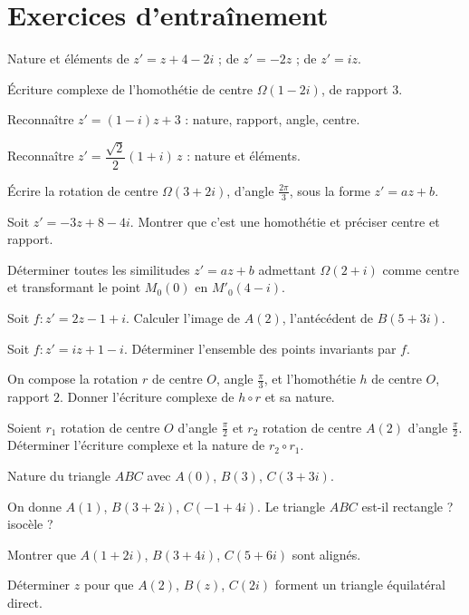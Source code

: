 \section{Exercices d'entraînement}

\exo{} Nature et éléments de $z'=z+4-2i$ ; de $z'=-2z$ ; de $z'=iz$.

\exo{} Écriture complexe de l'homothétie de centre $\Omega(1-2i)$, de rapport $3$.

\exo{} Reconnaître $z'=(1-i)z+3$ : nature, rapport, angle, centre.

\exo{} Reconnaître $z'=\dfrac{\sqrt2}{2}(1+i)\,z$ : nature et éléments.

\exo{} Écrire la rotation de centre $\Omega(3+2i)$, d'angle $\frac{2\pi}3$, sous la forme $z'=az+b$.

\exo{} Soit $z'=-3z+8-4i$. Montrer que c'est une homothétie et préciser centre et rapport.

\exo{} Déterminer toutes les similitudes $z'=az+b$ admettant $\Omega(2+i)$ comme centre et
transformant le point $M_0(0)$ en $M'_0(4-i)$.

\exo{} Soit $f:z'=2z-1+i$. Calculer l'image de $A(2)$, l'antécédent de $B(5+3i)$.

\exo{} Soit $f:z'=iz+1-i$. Déterminer l'ensemble des points invariants par $f$.

\exo{} On compose la rotation $r$ de centre $O$, angle $\frac\pi3$, et l'homothétie $h$ de
centre $O$, rapport $2$. Donner l'écriture complexe de $h\circ r$ et sa nature.

\exo{} Soient $r_1$ rotation de centre $O$ d'angle $\frac\pi2$ et $r_2$ rotation de centre
$A(2)$ d'angle $\frac\pi2$. Déterminer l'écriture complexe et la nature de $r_2\circ r_1$.

\exo{} Nature du triangle $ABC$ avec $A(0)$, $B(3)$, $C(3+3i)$.

\exo{} On donne $A(1)$, $B(3+2i)$, $C(-1+4i)$. Le triangle $ABC$ est-il rectangle ? isocèle ?

\exo{} Montrer que $A(1+2i)$, $B(3+4i)$, $C(5+6i)$ sont alignés.

\exo{} Déterminer $z$ pour que $A(2)$, $B(z)$, $C(2i)$ forment un triangle équilatéral direct.

